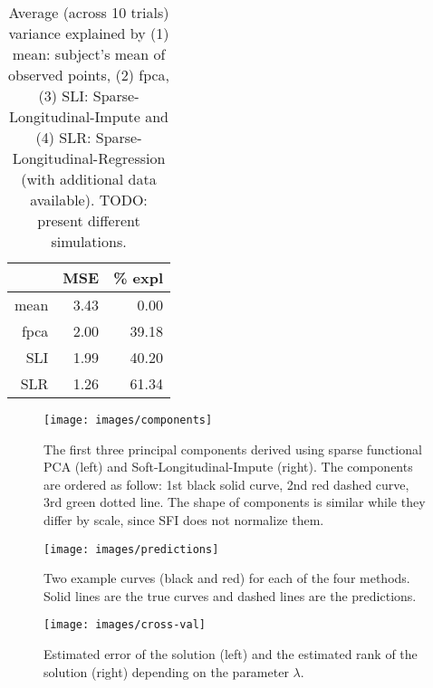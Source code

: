 \documentclass[preprint]{imsart}
\numberwithin{equation}{section}
\theoremstyle{plain}
\begin{document}
\begin{table}[ht]
\centering
\begin{tabular}{rrr}
  \hline
 & MSE & \% expl \\ 
  \hline
  mean & 3.43 & 0.00 \\ 
  fpca & 2.00 & 39.18 \\ 
  SLI & 1.99 & 40.20 \\ 
  SLR & 1.26 & 61.34 \\ 
   \hline
\end{tabular}\label{tbl:simulations}
\caption{Average (across 10 trials) variance explained by (1) mean: subject's mean of observed points, (2) fpca, (3) SLI: Sparse-Longitudinal-Impute and (4) SLR: Sparse-Longitudinal-Regression (with additional data available). TODO: present different simulations.}
\end{table}

\begin{figure}[h!]
  \texttt{[image: images/components]}
  \caption{The first three principal components derived using sparse functional PCA (left) and Soft-Longitudinal-Impute (right). The components are ordered as follow: 1st black solid curve, 2nd red dashed curve, 3rd green dotted line. The shape of components is similar while they differ by scale, since SFI does not normalize them.}
  \label{fig:principal-components}
\end{figure}

\begin{figure}[h!]
  \texttt{[image: images/predictions]}
  \caption{Two example curves (black and red) for each of the four methods. Solid lines are the true curves and dashed lines are the predictions. }
  \label{fig:example-predictions}
\end{figure}

\begin{figure}[h!]
  \texttt{[image: images/cross-val]}
  \caption{Estimated error of the solution (left) and the estimated rank of the solution (right) depending on the parameter $\lambda$.}
  \label{fig:estimated-rank}
\end{figure}


\end{document}
